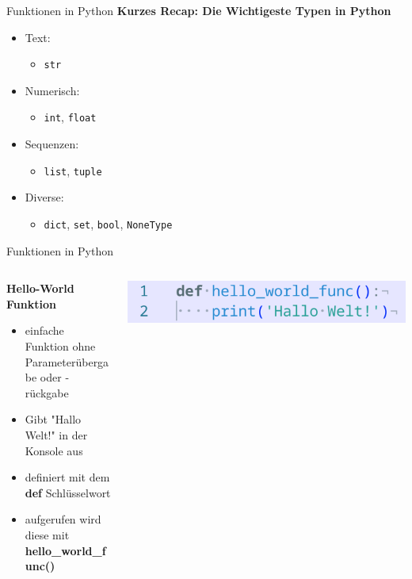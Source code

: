 \documentclass[aspectratio=169]{beamer}
\begin{document}
\begin{frame}{Funktionen in Python}
    \textbf{Kurzes Recap: Die Wichtigeste Typen in Python}
    \begin{itemize}
        \item Text:
        \begin{itemize}
            \item \texttt{str}
        \end{itemize}
        \item Numerisch:
        \begin{itemize}
            \item \texttt{int}, \texttt{float}
        \end{itemize}
        \item Sequenzen:
        \begin{itemize}
            \item \texttt{list}, \texttt{tuple}
        \end{itemize}
        \item Diverse:
        \begin{itemize}
            \item \texttt{dict}, \texttt{set}, \texttt{bool}, \texttt{NoneType}
        \end{itemize}
    \end{itemize}
\end{frame}

\begin{frame}{Funktionen in Python}
    \begin{columns}
        \begin{column}{0.5\textwidth}
            \textbf{Hello-World Funktion}
            \begin{itemize}
                \item einfache Funktion ohne Parameterübergabe oder -rückgabe
                \item Gibt "Hallo Welt!" in der Konsole aus
                \item definiert mit dem \textbf{def} Schlüsselwort
                \pause
                \item aufgerufen wird diese mit \textbf{hello\_world\_func()}
            \end{itemize}
        \end{column}
        \begin{column}{0.5\textwidth}
            \begin{tcolorbox}[colframe=oxfordblue, colback=blue!10, coltitle=white, title=Python]
                \includegraphics[width=\textwidth]{images/code_helloworldfunction.png}
            \end{tcolorbox}
        \end{column}
    \end{columns}
\end{frame}
\end{document}
